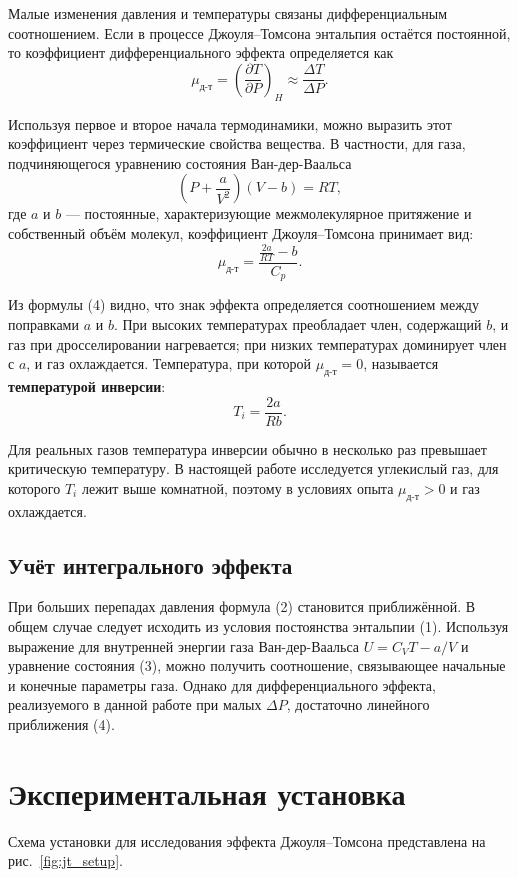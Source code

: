 \documentclass[a4paper, 12pt]{article}
\begin{document}
Малые изменения давления и температуры связаны дифференциальным соотношением. Если в процессе Джоуля–Томсона энтальпия остаётся постоянной, то коэффициент дифференциального эффекта определяется как
\[
\mu_{\text{д-т}} = \left( \frac{\partial T}{\partial P} \right)_H \approx \frac{\Delta T}{\Delta P}. \tag{2}
\]

Используя первое и второе начала термодинамики, можно выразить этот коэффициент через термические свойства вещества. В частности, для газа, подчиняющегося уравнению состояния Ван-дер-Ваальса
\[
\left(P + \frac{a}{V^2}\right)(V - b) = RT, \tag{3}
\]
где \(a\) и \(b\) — постоянные, характеризующие межмолекулярное притяжение и собственный объём молекул, коэффициент Джоуля–Томсона принимает вид:
\[
\mu_{\text{д-т}} = \frac{\frac{2a}{RT} - b}{C_p}. \tag{4}
\]

Из формулы (4) видно, что знак эффекта определяется соотношением между поправками \(a\) и \(b\). При высоких температурах преобладает член, содержащий \(b\), и газ при дросселировании нагревается; при низких температурах доминирует член с \(a\), и газ охлаждается. Температура, при которой \(\mu_{\text{д-т}} = 0\), называется \textbf{температурой инверсии}:
\[
T_i = \frac{2a}{Rb}. \tag{5}
\]

Для реальных газов температура инверсии обычно в несколько раз превышает критическую температуру. В настоящей работе исследуется углекислый газ, для которого \(T_i\) лежит выше комнатной, поэтому в условиях опыта \(\mu_{\text{д-т}} > 0\) и газ охлаждается.

\subsection{Учёт интегрального эффекта}
При больших перепадах давления формула (2) становится приближённой. В общем случае следует исходить из условия постоянства энтальпии (1). Используя выражение для внутренней энергии газа Ван-дер-Ваальса \(U = C_V T - a/V\) и уравнение состояния (3), можно получить соотношение, связывающее начальные и конечные параметры газа. Однако для дифференциального эффекта, реализуемого в данной работе при малых \(\Delta P\), достаточно линейного приближения (4).

\section{Экспериментальная установка}
Схема установки для исследования эффекта Джоуля–Томсона представлена на рис.~\ref{fig:jt_setup}.
\end{document}
